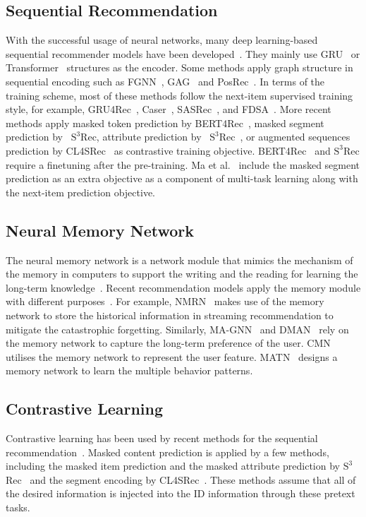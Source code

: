 \documentclass[conference]{IEEEtran}
\begin{document}
\subsection{Sequential Recommendation}
\label{sec:sr}
With the successful usage of neural networks, many deep learning-based sequential recommender models have been developed~\cite{gru4rec,caser,sasrec,fdsa,bert4rec,s3rec,s2s,safm,zhou2020contrastive,xie2020contrastive,fgnn,fgnnj,gag,posrec,causalrec,lightweight,seq2graph}. They mainly use GRU~\cite{gru} or Transformer~\cite{attention} structures as the encoder. Some methods apply graph structure in sequential encoding such as FGNN~\cite{fgnn,fgnnj}, GAG~\cite{gag} and PosRec~\cite{posrec}. In terms of the training scheme, most of these methods follow the next-item supervised training style, for example, GRU4Rec~\cite{gru4rec}, Caser~\cite{caser}, SASRec~\cite{sasrec}, and FDSA~\cite{fdsa}. More recent methods apply masked token prediction by BERT4Rec~\cite{bert4rec}, masked segment prediction by ~$\text{S}^3$Rec\cite{s3rec}, attribute prediction by ~$\text{S}^3$Rec~\cite{s3rec}, or augmented sequences prediction by CL4SRec~\cite{xie2020contrastive} as contrastive training objective. BERT4Rec~\cite{bert4rec} and $\text{S}^3$Rec require a finetuning after the pre-training. Ma et al.~\cite{s2s} include the masked segment prediction as an extra objective as a component of multi-task learning along with the next-item prediction objective.

\subsection{Neural Memory Network}
\label{sec:nmn}
The neural memory network is a network module that mimics the mechanism of the memory in computers to support the writing and the reading for learning the long-term knowledge~\cite{ntm}. Recent recommendation models apply the memory module with different purposes~\cite{matn,magnn,nmrn,cmn,dman}. For example, NMRN~\cite{nmrn} makes use of the memory network to store the historical information in streaming recommendation to mitigate the catastrophic forgetting. Similarly, MA-GNN~\cite{magnn} and DMAN~\cite{dman} rely on the memory network to capture the long-term preference of the user. CMN~\cite{cmn} utilises the memory network to represent the user feature. MATN~\cite{matn} designs a memory network to learn the multiple behavior patterns.

\subsection{Contrastive Learning}
\label{sec:cl}
Contrastive learning has been used by recent methods for the sequential recommendation~\cite{s3rec,s2s,zhou2020contrastive,xie2020contrastive,channel,hypergraph}. Masked content prediction is applied by a few methods, including the masked item prediction and the masked attribute prediction by $\text{S}^3$Rec~\cite{s3rec} and the segment encoding by CL4SRec~\cite{xie2020contrastive}. These methods assume that all of the desired information is injected into the ID information through these pretext tasks.
\end{document}
